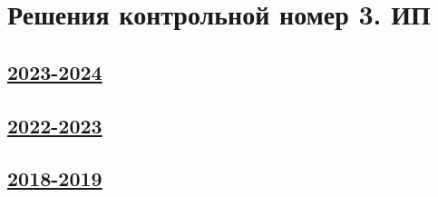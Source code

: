 \thispagestyle{empty}
\section{Решения контрольной номер 3. ИП}


\subsection[2023-2024]{\hyperref[sec:kr_03_ip_2023_2024]{2023-2024}}
\label{sec:sol_kr_03_ip_2023_2024}


\subsection[2022-2023]{\hyperref[sec:kr_03_ip_2022_2023]{2022-2023}}
\label{sec:sol_kr_03_ip_2022_2023}



\subsection[2018-2019]{\hyperref[sec:kr_03_ip_2018_2019]{2018-2019}}
\label{sec:sol_kr_03_ip_2018_2019}

